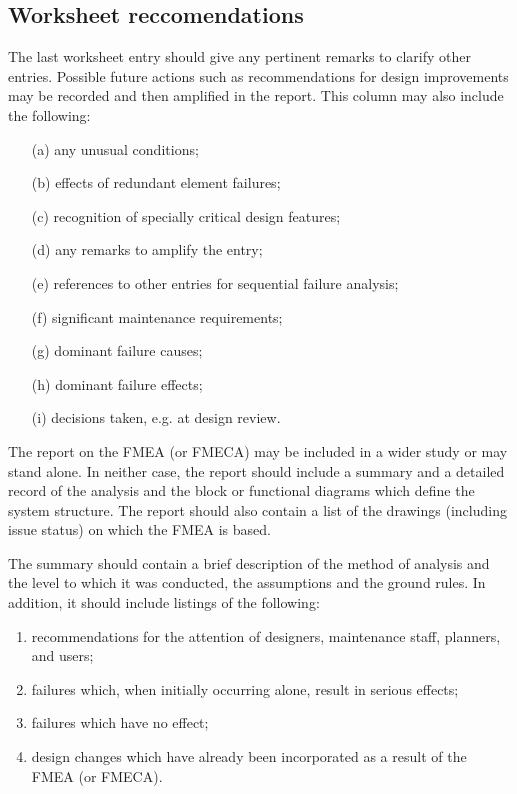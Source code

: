 \documentclass[./dissertation.tex]{subfiles}
\begin{document}
\subsection{Worksheet reccomendations}

The last worksheet entry should give any pertinent remarks to clarify other entries. Possible future actions such as recommendations for design improvements may be recorded and then amplified in the report. This column may also include the following:

\begin{enumerate}
\item[(a)] any unusual conditions;
\item[(b)] effects of redundant element failures;
\item[(c)] recognition of specially critical design features;
\item[(d)] any remarks to amplify the entry;
\item[(e)] references to other entries for sequential failure analysis;
\item[(f)] significant maintenance requirements;
\item[(g)] dominant failure causes;
\item[(h)] dominant failure effects;
\item[(i)] decisions taken, e.g. at design review.
\end{enumerate}


The report on the FMEA (or FMECA) may be included in a wider study or may stand alone. In neither case, the report should include a summary and a detailed record of the analysis and the block or functional diagrams which define the system structure. The report should also contain a list of the drawings (including issue status) on which the FMEA is based.

The summary should contain a brief description of the method of analysis and the level to which it was conducted, the assumptions and the ground rules. In addition, it should include listings of the following:

\begin{enumerate}
\item recommendations for the attention of designers, maintenance staff, planners, and users;
\item failures which, when initially occurring alone, result in serious effects;
\item failures which have no effect;
\item design changes which have already been incorporated as a result of the FMEA (or FMECA).
\end{enumerate}
\end{document}
